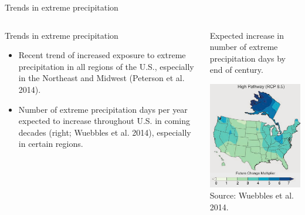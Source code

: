 \documentclass[ignorenonframetext,]{beamer}
\begin{document}
\begin{frame}{Trends in extreme precipitation}

\begin{columns}

\begin{column}{0.5\textwidth}
\begin{block}{Trends in extreme precipitation}
\small
\begin{itemize}
  \item Recent trend of increased exposure to extreme precipitation in all regions of the U.S., especially in the Northeast and Midwest (Peterson et al. 2014).
  \item Number of extreme precipitation days per year expected to increase throughout U.S. in coming decades (right; Wuebbles et al. 2014), especially in certain regions.
\end{itemize}
\end{block}
\end{column}

\begin{column}{0.5\textwidth}
\vspace{-0.2cm}
\begin{center}
\footnotesize Expected increase in number of extreme precipitation days by end of century.
\end{center}
\vspace{-0.2cm}

\includegraphics[width=\textwidth]{projs_extreme_rain} 
\vspace{-0.1cm}
\scriptsize Source: Wuebbles et al. 2014.
\end{column}

\end{columns}

\end{frame}
\end{document}
